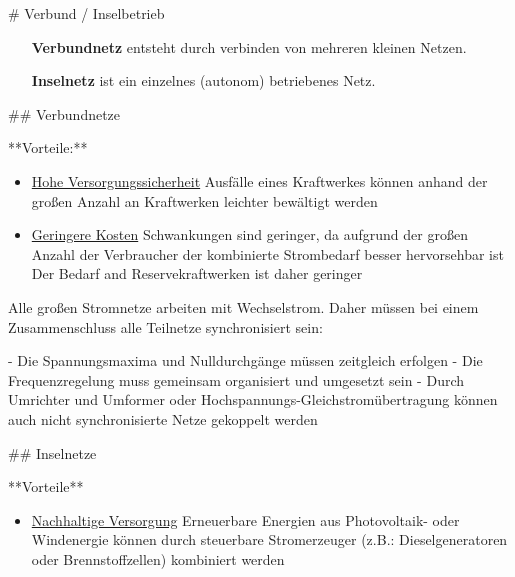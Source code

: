 \begin{markdown}

# Verbund / Inselbetrieb

\begin{itemize}
    \item[\textbf{Verbundnetz}] entsteht durch verbinden von mehreren kleinen Netzen.
    \item[\textbf{Inselnetz}] ist ein einzelnes (autonom) betriebenes Netz. 
\end{itemize}

## Verbundnetze


**Vorteile:**

\begin{itemize}
    \item \underline{Hohe Versorgungssicherheit}
    \newline Ausfälle eines Kraftwerkes können anhand der großen Anzahl an Kraftwerken leichter bewältigt werden
    \item \underline{Geringere Kosten}
    \newline Schwankungen sind geringer, da aufgrund der großen Anzahl der Verbraucher der kombinierte Strombedarf besser hervorsehbar ist
    \newline Der Bedarf and Reservekraftwerken ist daher geringer
\end{itemize}

Alle großen Stromnetze arbeiten mit Wechselstrom. Daher müssen bei einem Zusammenschluss alle Teilnetze synchronisiert sein:

- Die Spannungsmaxima und Nulldurchgänge müssen zeitgleich erfolgen
- Die Frequenzregelung muss gemeinsam organisiert und umgesetzt sein
- Durch Umrichter und Umformer oder Hochspannungs-Gleichstromübertragung können auch nicht synchronisierte Netze gekoppelt werden


## Inselnetze

**Vorteile**

\begin{itemize}
    \item \underline{Nachhaltige Versorgung}
    \newline Erneuerbare Energien aus Photovoltaik- oder Windenergie können durch steuerbare Stromerzeuger (z.B.: Dieselgeneratoren oder Brennstoffzellen) kombiniert werden
\end{itemize}


\end{markdown}
